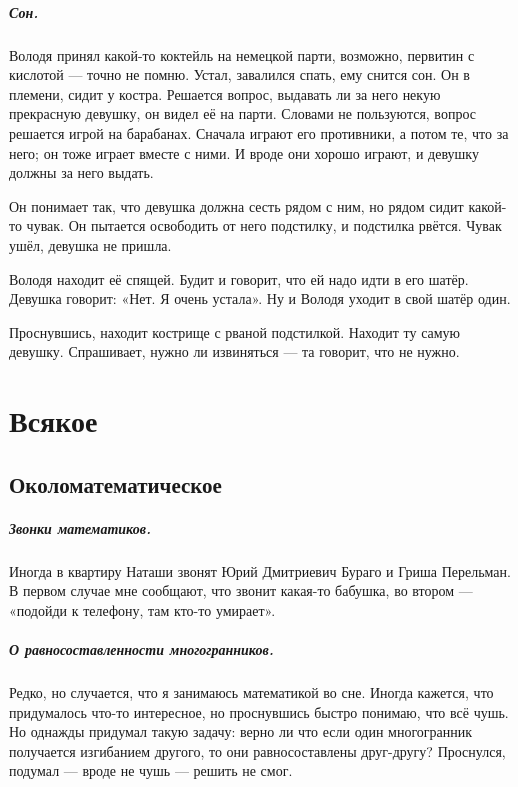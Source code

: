 \documentclass{book}
\begin{document}
\paragraph{Сон.}
Володя принял какой-то коктейль на немецкой парти, возможно, первитин с кислотой --- точно не помню.
Устал, завалился спать, ему снится сон.
Он в племени, сидит у костра. 
Решается вопрос, выдавать ли за него некую прекрасную девушку, он видел её на парти.
Словами не пользуются, вопрос решается игрой на барабанах. 
Сначала играют его противники, а потом те, что за него;
он тоже играет вместе с ними.
И вроде они хорошо играют, и девушку должны за него выдать.

Он понимает так, что девушка должна сесть рядом с ним, но рядом сидит какой-то чувак.
Он пытается освободить от него подстилку, и подстилка рвётся.
Чувак ушёл, девушка не пришла.

Володя находит её спящей.
Будит и говорит, что ей надо идти в его шатёр.
Девушка говорит: «Нет. Я очень устала».
Ну и Володя уходит в свой шатёр один.

Проснувшись, находит кострище с рваной подстилкой.
Находит ту самую девушку.
Спрашивает, нужно ли извиняться --- та говорит, что не нужно.




\chapter*{Всякое}

\section*{Околоматематическое}

\paragraph{Звонки математиков.}
Иногда в квартиру Наташи звонят Юрий Дмитриевич Бураго и Гриша Перельман.
В первом случае мне сообщают, что звонит какая-то бабушка, во втором --- «подойди к телефону, там кто-то умирает».

\paragraph{О равносоставленности многогранников.}
Редко, но случается, что я занимаюсь математикой во сне.
Иногда кажется, что придумалось что-то интересное, но проснувшись быстро понимаю, что всё чушь.
Но однажды придумал такую задачу: верно ли что если один многогранник получается изгибанием другого, то они равносоставлены друг-другу?
Проснулся, подумал --- вроде не чушь --- решить не смог.
\end{document}
